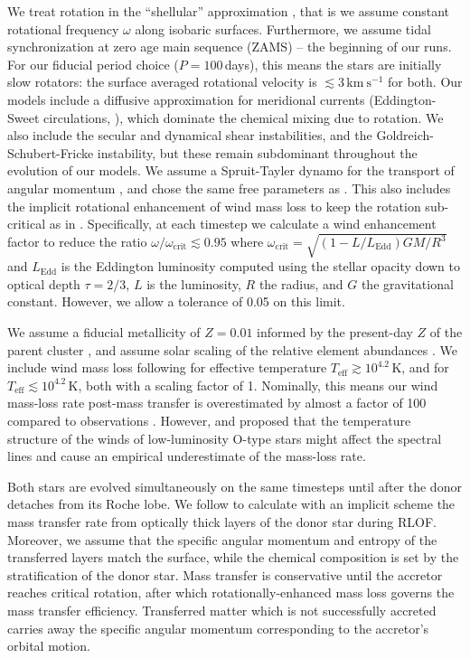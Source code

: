 \documentclass[twocolumn,twocolappendix,trackchanges]{aastex63}
\newcommand{\kms}{{\mathrm{km\ s^{-1}}}}
\begin{document}
We treat rotation in the ``shellular'' approximation
\citep[e.g.,][]{zahn:92, ekstrom:12}, that is we
assume constant rotational frequency $\omega$ along isobaric
surfaces. Furthermore, we assume tidal synchronization at zero age
main sequence (ZAMS) -- the beginning of our runs. For our fiducial
period choice ($P=100$\,days), this means the stars are initially slow
rotators: the surface averaged rotational velocity is
$\lesssim3\,\kms$ for both. Our models include a diffusive
approximation for meridional currents (Eddington-Sweet circulations, \citep{sweet:50}), which
dominate the chemical mixing due to rotation. We also include the
secular and dynamical shear instabilities, and the
Goldreich-Schubert-Fricke instability, but these remain subdominant
throughout the evolution of our models.  We assume a Spruit-Tayler
dynamo for the transport of angular momentum \citep{spruit:02}, and
chose the same free parameters as \cite{heger:00}. This also includes
the implicit rotational enhancement of wind mass loss to keep the
rotation sub-critical as in \cite{langer:98}. Specifically, at each
timestep we calculate a wind enhancement factor to reduce the ratio
$\omega/\omega_\mathrm{crit}\lesssim 0.95$ where
$\omega_\mathrm{crit}=\sqrt{(1-L/L_\mathrm{Edd})GM/R^3}$ and
$L_\mathrm{Edd}$ is the Eddington luminosity computed using the
stellar opacity down to optical depth
$\tau=2/3$, $L$ is the luminosity, $R$ the radius, and $G$
the gravitational constant. However, we allow a tolerance of 0.05 on
this limit.



We assume a fiducial metallicity of $Z=0.01$ informed by the
present-day $Z$ of the parent cluster \citep{murphy:21}, and assume
solar scaling of the relative element abundances \citep{grevesse:98}. We include wind mass loss following
\cite{vink:00,vink:01} for effective
temperature $T_\mathrm{eff}\gtrsim10^{4.2}$\,K, and \cite{dejager:88} for  $T_\mathrm{eff}\lesssim10^{4.2}$\,K, both with a scaling
factor of 1. Nominally, this means our wind mass-loss rate post-mass
transfer is overestimated by almost a factor of 100 compared to
observations \citep[weak wind problem, see][]{marcolino:09}.  However,
\cite{lucy:12} and \cite{lagae:21} proposed that the temperature
structure of the winds of low-luminosity O-type stars might affect the
spectral lines and cause an empirical underestimate of the mass-loss
rate.

Both stars are evolved simultaneously on the same timesteps until
after the donor detaches from its Roche lobe. We follow \cite{kolb:90}
to calculate with an implicit scheme the mass transfer rate from
optically thick layers of the donor star during RLOF. Moreover, we
assume that the specific angular momentum and entropy of the
transferred layers match the surface, while the chemical composition
is set by the stratification of the donor star. Mass transfer is
conservative until the accretor reaches critical rotation, after which
rotationally-enhanced mass loss governs the mass transfer efficiency.
Transferred matter which is not successfully accreted carries away the
specific angular momentum corresponding to the accretor's orbital
motion.
\end{document}
